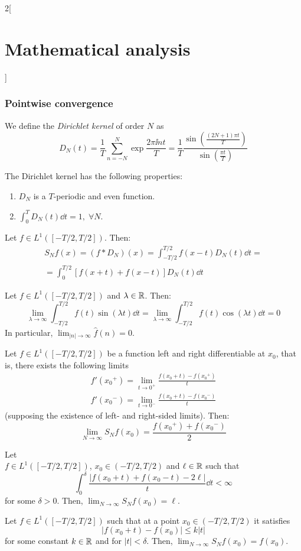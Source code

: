 \documentclass[../../../main.tex]{subfiles}
\begin{document}
\begin{multicols}{2}[\section{Mathematical analysis}]
  \subsubsection{Pointwise convergence}
  \begin{definition}
    We define the \emph{Dirichlet kernel} of order $N$ as $$D_N(t)=\frac{1}{T}\sum_{n=-N}^N\exp{\frac{2\pi\ii nt}{T}}=\frac{1}{T}\frac{\sin\left(\frac{(2N+1)\pi t}{T}\right)}{\sin\left(\frac{\pi t}{T}\right)}$$
  \end{definition}
  \begin{proposition}
    The Dirichlet kernel has the following properties:
    \begin{enumerate}
      \item $D_N$ is a $T$-periodic and even function.
      \item $\displaystyle\int_0^TD_N(t)\dd{t}=1,\;\forall N$.
    \end{enumerate}
  \end{proposition}
  \begin{proposition}
    Let $f\in L^1([-T/2,T/2])$. Then:
    \begin{multline*}
      S_Nf(x)=(f*D_N)(x)=\int_{-T/2}^{T/2}f(x-t)D_N(t)\dd{t}=\\=\int_0^{T/2}[f(x+t)+f(x-t)]D_N(t)\dd{t}
    \end{multline*}
  \end{proposition}
  \begin{lemma}
    Let $f\in L^1([-T/2,T/2])$ and $\lambda\in\mathbb{R} $. Then: $$\lim_{\lambda\to\infty}\int_{-T/2}^{T/2}f(t)\sin(\lambda t)\dd{t}=\lim_{\lambda\to\infty}\int_{-T/2}^{T/2}f(t)\cos(\lambda t)\dd{t}=0$$ In particular, $\displaystyle\lim_{|n|\to\infty}\widehat{f}(n)=0$.
  \end{lemma}
  \begin{theorem}
    Let $f\in L^1([-T/2,T/2])$ be a function left and right differentiable at $x_0$, that is, there exists the following limits
    \begin{gather*}
      f'({x_0}^+)=\lim_{t\to0^+}\frac{f(x_0+t)-f({x_0}^+)}{t}\\
      f'({x_0}^-)=\lim_{t\to0^-}\frac{f(x_0+t)-f({x_0}^-)}{t}
    \end{gather*}(supposing the existence of left- and right-sided limits). Then: $$\lim_{N\to\infty}S_Nf(x_0)=\frac{f({x_0}^+)+f({x_0}^-)}{2}$$
  \end{theorem}
  \begin{theorem}
    Let \\$f\in L^1([-T/2,T/2])$, $x_0\in (-T/2,T/2)$ and $\ell\in\mathbb{R} $ such that $$\int_0^\delta\frac{|f(x_0+t)+f(x_0-t)-2\ell|}{t}\dd{t}<\infty$$ for some $\delta>0$. Then, $\displaystyle\lim_{N\to\infty}S_Nf(x_0)=\ell$.
  \end{theorem}
  \begin{theorem}
    Let $f\in L^1([-T/2,T/2])$ such that at a point $x_0\in (-T/2,T/2)$ it satisfies $$|f(x_0+t)-f(x_0)|\leq k|t|$$ for some constant $k\in\mathbb{R} $ and for $|t|<\delta$. Then, $\displaystyle\lim_{N\to\infty}S_Nf(x_0)=f(x_0)$.
  \end{theorem}

\end{multicols}
\end{document}
